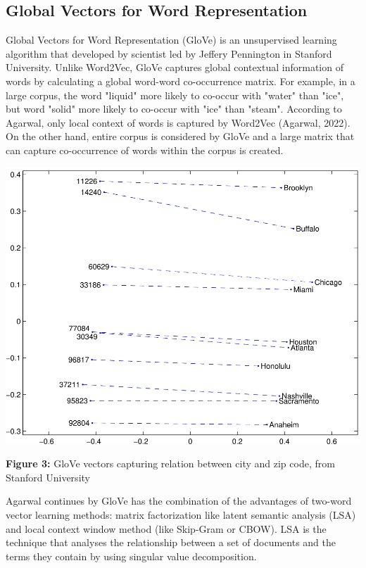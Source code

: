 \documentclass[man]{apa7}
\begin{document}
\subsection{Global Vectors for Word Representation}
Global Vectors for Word Representation (GloVe) is an unsupervised learning algorithm that developed by scientist led by Jeffery Pennington in Stanford University. Unlike Word2Vec, GloVe captures global contextual information of words by calculating a global word-word co-occurrence matrix. For example, in a large corpus, the word "liquid" more likely to co-occur with "water" than "ice", but word "solid" more likely to co-occur with "ice" than "steam". According to Agarwal, only local context of words is captured by Word2Vec (Agarwal, 2022). On the other hand, entire corpus is considered by GloVe and a large matrix that can capture co-occurrence of words within the corpus is created.
\\[2\baselineskip]

\begin{center}
\includegraphics[scale=3]{city_zip.jpg}

\textbf{Figure 3:} GloVe vectors capturing relation between city and zip code, from Stanford University\\[2\baselineskip]

\end{center}

Agarwal continues by GloVe has the combination of the advantages of two-word vector learning methods: matrix factorization like latent semantic analysis (LSA) and local context window method (like Skip-Gram or CBOW). LSA is the technique that analyses the relationship between a set of documents and the terms they contain by using singular value decomposition. 
\end{document}
